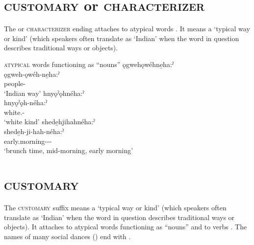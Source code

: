 \section{ \textsc{customary} or \textsc{characterizer}} \label{-neha:ˀ}
The  \textsc{\customary} or \textsc{characterizer} ending attaches to atypical words . It means a ‘typical way or kind’ (which speakers often translate as ‘Indian’ when the word in question describes traditional ways or objects).

\ea\label{ex:nehex} \textsc{atypical} words functioning as “nouns”
\ea ǫgwehǫwéhne̱ha:ˀ\\
\gll ǫgweh-ǫwéh-ne̱ha:ˀ\\
 people-\exsc{\typicalizer-\customary}\\
\glt `Indian way'
\ex hnyǫˀǫhnéha:ˀ\\
\gll hnyǫˀǫh-néha:ˀ\\
 white.{\stative}-\exsc{\customary}\\
\glt `white kind'
\ex shede̱hjihahnéha:ˀ\\
\gll shede̱h-ji-hah-néha:ˀ\\
 early.morning-\textsc{\intensifier-\diminutive-\customary}\\
\glt `brunch time, mid-morning, early morning'
\z
\z

\section{ \textsc{customary}} \label{-geha:ˀ}
The  \textsc{customary} suffix means a ‘typical way or kind’ (which speakers often translate as ‘Indian’ when the word in question describes traditional ways or objects). It attaches to atypical words functioning as “nouns”  and to verbs . The names of many social dances () end with  .

